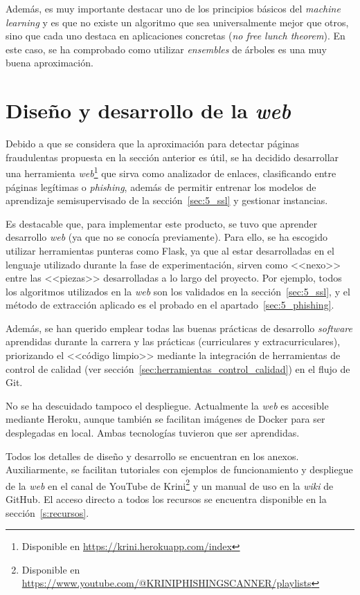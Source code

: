 Además, es muy importante destacar uno de los principios básicos del \textit{machine learning} y es que no existe un algoritmo que sea universalmente mejor que otros, sino que cada uno destaca en aplicaciones concretas (\textit{no free lunch theorem}). En este caso, se ha comprobado como utilizar \textit{ensembles} de árboles es una muy buena aproximación.


\section{Diseño y desarrollo de la \textit{web}}
\label{s:web-krini}

Debido a que se considera que la aproximación para detectar páginas fraudulentas propuesta en la sección anterior es útil, se ha decidido desarrollar una herramienta \textit{web}\footnote{Disponible en \url{https://krini.herokuapp.com/index}} que sirva como analizador de enlaces, clasificando entre páginas legítimas o \textit{phishing}, además de permitir entrenar los modelos de aprendizaje semisupervisado de la sección~\ref{sec:5_ssl} y gestionar instancias.

Es destacable que, para implementar este producto, se tuvo que aprender desarrollo \textit{web} (ya que no se conocía previamente). Para ello, se ha escogido utilizar herramientas punteras como Flask, ya que al estar desarrolladas en el lenguaje utilizado durante la fase de experimentación, sirven como <<nexo>> entre las <<piezas>> desarrolladas a lo largo del proyecto. Por ejemplo, todos los algoritmos utilizados en la \textit{web} son los validados en la sección~\ref{sec:5_ssl}, y el método de extracción aplicado es el probado en el apartado~\ref{sec:5_phishing}.

Además, se han querido emplear todas las buenas prácticas de desarrollo \textit{software} aprendidas durante la carrera y las prácticas (curriculares y extracurriculares), priorizando el <<código limpio>> mediante la integración de herramientas de control de calidad (ver sección~\ref{sec:herramientas_control_calidad}) en el flujo de Git.

No se ha descuidado tampoco el despliegue. Actualmente la \textit{web} es accesible mediante Heroku, aunque también se facilitan imágenes de Docker para ser desplegadas en local. Ambas tecnologías tuvieron que ser aprendidas.

Todos los detalles de diseño y desarrollo se encuentran en los anexos. Auxiliarmente, se facilitan tutoriales con ejemplos de funcionamiento y despliegue de la \textit{web} en el canal de YouTube de Krini\footnote{Disponible en \url{https://www.youtube.com/@KRINIPHISHINGSCANNER/playlists}} y un manual de uso en la \textit{wiki} de GitHub. El acceso directo a todos los recursos se encuentra disponible en la sección~\ref{s:recursos}.
